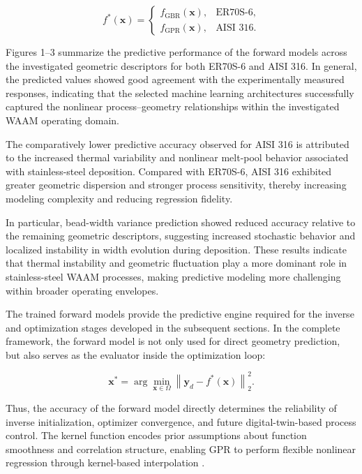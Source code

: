 \documentclass[11pt]{article}
\begin{document}
\begin{equation}
f^{*}(\mathbf{x})
=
\begin{cases}
f_{\mathrm{GBR}}(\mathbf{x}), & \text{ER70S-6},\\
f_{\mathrm{GPR}}(\mathbf{x}), & \text{AISI 316}.
\end{cases}
\end{equation}

Figures 1--3 summarize the predictive performance of the forward models across the investigated geometric descriptors for both ER70S-6 and AISI 316. In general, the predicted values showed good agreement with the experimentally measured responses, indicating that the selected machine learning architectures successfully captured the nonlinear process--geometry relationships within the investigated WAAM operating domain.

The comparatively lower predictive accuracy observed for AISI 316 is attributed to the increased thermal variability and nonlinear melt-pool behavior associated with stainless-steel deposition. Compared with ER70S-6, AISI 316 exhibited greater geometric dispersion and stronger process sensitivity, thereby increasing modeling complexity and reducing regression fidelity. 

In particular, bead-width variance prediction showed reduced accuracy relative to the remaining geometric descriptors, suggesting increased stochastic behavior and localized instability in width evolution during deposition. These results indicate that thermal instability and geometric fluctuation play a more dominant role in stainless-steel WAAM processes, making predictive modeling more challenging within broader operating envelopes.

The trained forward models provide the predictive engine required for the inverse and optimization stages developed in the subsequent sections. In the complete framework, the forward model is not only used for direct geometry prediction, but also serves as the evaluator inside the optimization loop:

\begin{equation}
\mathbf{x}^{*}
=
\arg\min_{\mathbf{x}\in\Omega}
\left\|
\mathbf{y}_d
-
f^{*}(\mathbf{x})
\right\|_2^2.
\end{equation}

Thus, the accuracy of the forward model directly determines the reliability of inverse initialization, optimizer convergence, and future digital-twin-based process control. The kernel function encodes prior assumptions about function smoothness and correlation structure, enabling GPR to perform flexible nonlinear regression through kernel-based interpolation \cite{Rasmussen2006}. 
\end{document}
